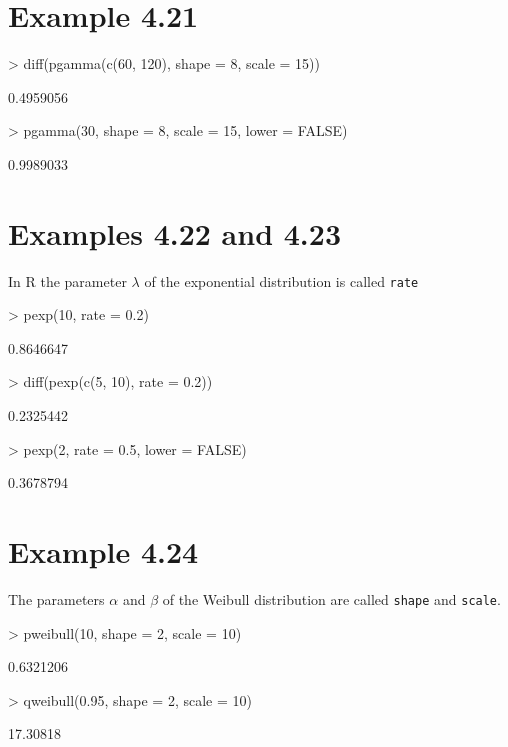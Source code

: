 \documentclass{book}
\begin{document}
\section{Example 4.21}
\label{sec:xmp0421}

\begin{Schunk}
\begin{Sinput}
> diff(pgamma(c(60, 120), shape = 8, scale = 15))
\end{Sinput}
\begin{Soutput}
[1] 0.4959056
\end{Soutput}
\begin{Sinput}
> pgamma(30, shape = 8, scale = 15, lower = FALSE)
\end{Sinput}
\begin{Soutput}
[1] 0.9989033
\end{Soutput}
\end{Schunk}


\section{Examples 4.22 and 4.23}
\label{sec:xmp0422}

In R the parameter $\lambda$ of the exponential distribution is called
\texttt{rate}
\begin{Schunk}
\begin{Sinput}
> pexp(10, rate = 0.2)
\end{Sinput}
\begin{Soutput}
[1] 0.8646647
\end{Soutput}
\begin{Sinput}
> diff(pexp(c(5, 10), rate = 0.2))
\end{Sinput}
\begin{Soutput}
[1] 0.2325442
\end{Soutput}
\begin{Sinput}
> pexp(2, rate = 0.5, lower = FALSE)
\end{Sinput}
\begin{Soutput}
[1] 0.3678794
\end{Soutput}
\end{Schunk}

\section{Example 4.24}
\label{sec:xmp0424}

The parameters $\alpha$ and $\beta$ of the Weibull distribution are
called \texttt{shape} and \texttt{scale}.
\begin{Schunk}
\begin{Sinput}
> pweibull(10, shape = 2, scale = 10)
\end{Sinput}
\begin{Soutput}
[1] 0.6321206
\end{Soutput}
\begin{Sinput}
> qweibull(0.95, shape = 2, scale = 10)
\end{Sinput}
\begin{Soutput}
[1] 17.30818
\end{Soutput}
\end{Schunk}
\end{document}
